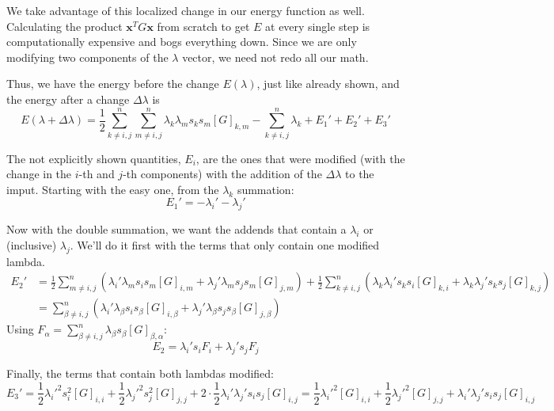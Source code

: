 We take advantage of this localized change in our energy function as well. Calculating the product $\mathbf{x}^TG \mathbf{x}$ from scratch to get $E$ at every single step is computationally expensive and bogs everything down. Since we are only modifying two components of the $\lambda$ vector, we need not redo all our math.

Thus, we have the energy before the change \(E(\lambda )\), just like already shown, and the energy after a change \(\Delta \lambda\) is
\begin{equation*}
    E(\lambda+\Delta \lambda) =
    \frac{1}{2}\sum_{k\neq i,j}^{n} \sum_{m\neq i,j}^{n} \lambda _k \lambda _m s_ks_m[G]_{k,m} -\sum_{k\neq i,j}^{n} \lambda _k + E_1' + E_2' + E_3'
\end{equation*}

The  not explicitly shown quantities, \(E_i\), are the ones that were modified (with the change in the \(i\)-th and \(j\)-th components) with the addition of the \(\Delta \lambda\) to the imput. Starting with the easy one, from the \(\lambda_k\) summation:
\begin{equation*}
    E_1' = -\lambda _i'-\lambda _j'
\end{equation*}

Now with the double summation, we want the addends that contain a \(\lambda _i\) or (inclusive) \(\lambda_j\). We'll do it first with the terms that only contain one modified lambda.
\begin{align*}
    E_2' &= \frac{1}{2}\sum_{m\neq i,j}^{n} \left(  \lambda _i'\lambda _ms_is_m[G]_{i,m} +  \lambda _j'\lambda _ms_js_m[G]_{j,m}  \right)+
    \frac{1}{2}\sum_{k\neq i,j}^{n}  \left( 
    \lambda _k \lambda _i's_ks_i[G]_{k,i} +
    \lambda _k \lambda _j's_ks_j[G]_{k,j}
     \right) \\
     &= \sum_{\beta\neq i,j}^{n} \left(  \lambda _i'\lambda _\beta s_is_\beta [G]_{i,\beta } +  \lambda _j'\lambda _\beta s_js_\beta [G]_{j,\beta }  \right)
\end{align*}
Using \(F_\alpha = \sum_{\beta\neq i,j}^{n}\lambda _\beta s_\beta [G]_{\beta ,\alpha } \)\futnotetext{}:
\begin{equation*}
    E_2 = \lambda _i's_i F_i + \lambda _j's_jF_j
\end{equation*}


Finally, the terms that contain both lambdas modified:
\begin{equation*}
    E_3'=\frac{1}{2}\lambda _i'^2s_i^2[G]_{i,i}+
    \frac{1}{2}\lambda _j'^2s_j^2[G]_{j,j}+
    2\cdot \frac{1}{2}\lambda_i'\lambda_j's_is_j[G]_{i,j}=
    \frac{1}{2}\lambda _i'^2[G]_{i,i}+
    \frac{1}{2}\lambda _j'^2[G]_{j,j}+
    \lambda_i'\lambda_j's_is_j[G]_{i,j}
\end{equation*}

